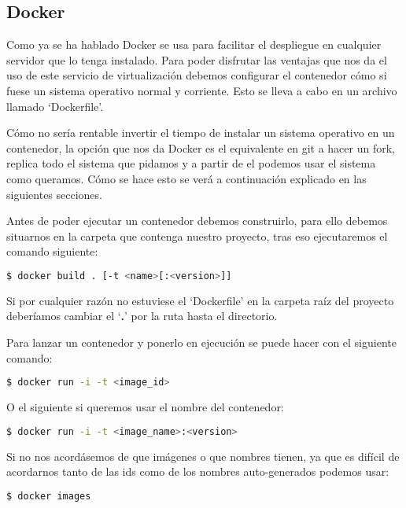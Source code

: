 \subsection{Docker}

Como ya se ha hablado Docker se usa para facilitar el despliegue en cualquier servidor que lo tenga instalado. Para poder disfrutar las ventajas que nos da el uso de este servicio de virtualización debemos configurar el contenedor cómo si fuese un sistema operativo normal y corriente. Esto se lleva a cabo en un archivo llamado `Dockerfile'.

Cómo no sería rentable invertir el tiempo de instalar un sistema operativo en un contenedor, la opción que nos da Docker es el equivalente en git a hacer un fork, replica todo el sistema que pidamos y a partir de el podemos usar el sistema como queramos. Cómo se hace esto se verá a continuación explicado en las siguientes secciones.

Antes de poder ejecutar un contenedor debemos construirlo, para ello debemos situarnos en la carpeta que contenga nuestro proyecto, tras eso ejecutaremos el comando siguiente:

\lstset{style=linestyle}
\begin{lstlisting}[language=bash]
    $ docker build . [-t <name>[:<version>]]
\end{lstlisting}

Si por cualquier razón no estuviese el `Dockerfile' en la carpeta raíz del proyecto deberíamos cambiar el `\textbf{.}' por la ruta hasta el directorio.

Para lanzar un contenedor y ponerlo en ejecución se puede hacer con el siguiente comando:

\lstset{style=linestyle}
\begin{lstlisting}[language=bash]
    $ docker run -i -t <image_id>
\end{lstlisting}

O el siguiente si queremos usar el nombre del contenedor:

\lstset{style=linestyle}
\begin{lstlisting}[language=bash]
    $ docker run -i -t <image_name>:<version>
\end{lstlisting}

Si no nos acordásemos de que imágenes o que nombres tienen, ya que es difícil de acordarnos tanto de las ids como de los nombres auto-generados podemos usar:

\lstset{style=linestyle}
\begin{lstlisting}[language=bash]
    $ docker images
\end{lstlisting}

